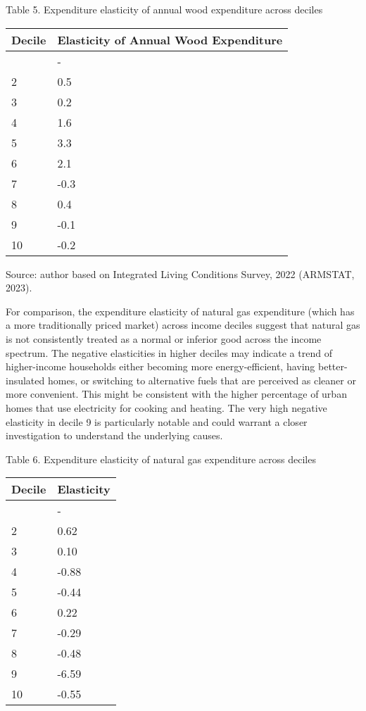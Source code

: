 \documentclass[
  letterpaper,
  DIV=11,
  numbers=noendperiod]{scrartcl}
\begin{document}
\label{_Ref154862129}{}Table 5. Expenditure elasticity of
annual wood expenditure across deciles

\begin{longtable}[]{@{}ll@{}}
\toprule\noalign{}
Decile & Elasticity of Annual Wood Expenditure \\
\midrule\noalign{}
\endhead
\bottomrule\noalign{}
\endlastfoot
1 & - \\
2 & 0.5 \\
3 & 0.2 \\
4 & 1.6 \\
5 & 3.3 \\
6 & 2.1 \\
7 & -0.3 \\
8 & 0.4 \\
9 & -0.1 \\
10 & -0.2 \\
\end{longtable}

Source: author based on Integrated Living Conditions Survey, 2022
(ARMSTAT, 2023).

For comparison, the expenditure elasticity of natural gas expenditure
(which has a more traditionally priced market) across income deciles
suggest that natural gas is not consistently treated as a normal or
inferior good across the income spectrum. The negative elasticities in
higher deciles may indicate a trend of higher-income households either
becoming more energy-efficient, having better-insulated homes, or
switching to alternative fuels that are perceived as cleaner or more
convenient. This might be consistent with the higher percentage of urban
homes that use electricity for cooking and heating. The very high
negative elasticity in decile 9 is particularly notable and could
warrant a closer investigation to understand the underlying causes.

\label{_Toc156819377}{}Table 6. Expenditure elasticity of
natural gas expenditure across deciles

\begin{longtable}[]{@{}ll@{}}
\toprule\noalign{}
Decile & Elasticity \\
\midrule\noalign{}
\endhead
\bottomrule\noalign{}
\endlastfoot
1 & - \\
2 & 0.62 \\
3 & 0.10 \\
4 & -0.88 \\
5 & -0.44 \\
6 & 0.22 \\
7 & -0.29 \\
8 & -0.48 \\
9 & -6.59 \\
10 & -0.55 \\
\end{longtable}
\end{document}
